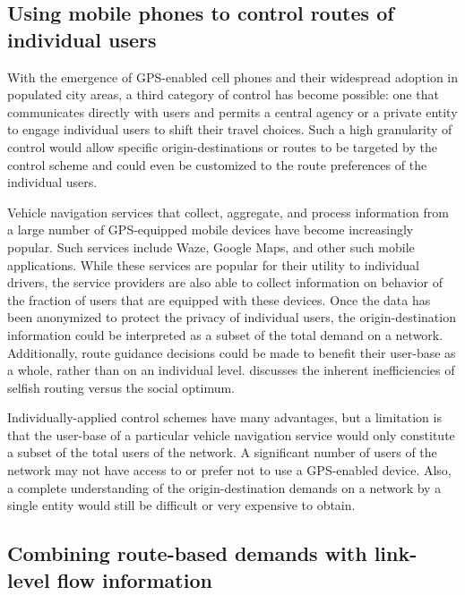 \subsection{Using mobile phones to control routes of individual users\label{sub:Using-cell-phones}}

With the emergence of GPS-enabled cell phones and their widespread
adoption in populated city areas, a third category of control has
become possible: one that communicates directly with users and permits
a central agency or a private entity to engage individual users to
shift their travel choices. Such a high granularity of control would
allow specific origin-destinations or routes to be targeted by the
control scheme and could even be customized to the route preferences
of the individual users.

Vehicle navigation services that collect, aggregate, and process information
from a large number of GPS-equipped mobile devices have become increasingly
popular. Such services include Waze, Google Maps, and other such mobile
applications. While these services are popular for their utility to
individual drivers, the service providers are also able to collect
information on behavior of the fraction of users that are equipped
with these devices. Once the data has been anonymized to protect the
privacy of individual users, the origin-destination information could
be interpreted as a subset of the total demand on a network. Additionally,
route guidance decisions could be made to benefit their user-base
as a whole, rather than on an individual level. \cite{Papadimitriou2001}
discusses the inherent inefficiencies of selfish routing versus the
social optimum.

Individually-applied control schemes have many advantages, but a limitation
is that the user-base of a particular vehicle navigation service would
only constitute a subset of the total users of the network. A significant
number of users of the network may not have access to or prefer not
to use a GPS-enabled device. Also, a complete understanding of the
origin-destination demands on a network by a single entity would still
be difficult or very expensive to obtain.


\subsection{Combining route-based demands with link-level flow information\label{sub:Scenario:-combining-route-based}}

